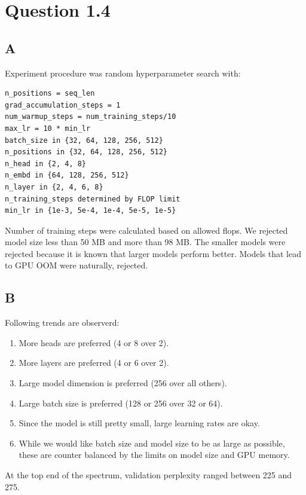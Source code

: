 \documentclass{article}
\begin{document}
\section*{Question 1.4}
\subsection*{A}
Experiment procedure was random hyperparameter search with:
\begin{verbatim}
n_positions = seq_len
grad_accumulation_steps = 1
num_warmup_steps = num_training_steps/10
max_lr = 10 * min_lr
batch_size in {32, 64, 128, 256, 512}
n_positions in {32, 64, 128, 256, 512}
n_head in {2, 4, 8}
n_embd in {64, 128, 256, 512}
n_layer in {2, 4, 6, 8}
n_training_steps determined by FLOP limit
min_lr in {1e-3, 5e-4, 1e-4, 5e-5, 1e-5}
\end{verbatim}
 Number of training steps were calculated based on allowed flops. We rejected model size less than 50 MB and more than 98 MB. The smaller models were rejected because it is known that larger models perform better. Models that lead to GPU OOM were naturally, rejected.
\subsection*{B}
Following trends are observerd:
\begin{enumerate}
\item More heads are preferred (4 or 8 over 2).
\item More layers are preferred (4 or 6 over 2).
\item Large model dimension is preferred (256 over all others).
\item Large batch size is preferred (128 or 256 over 32 or 64).
\item Since the model is still pretty small, large learning rates are okay.
\item While we would like batch size and model size to be as large as possible, these are counter balanced by the limits on model size and GPU memory.
\end{enumerate}
At the top end of the spectrum, validation perplexity ranged between 225 and 275.
\end{document}
